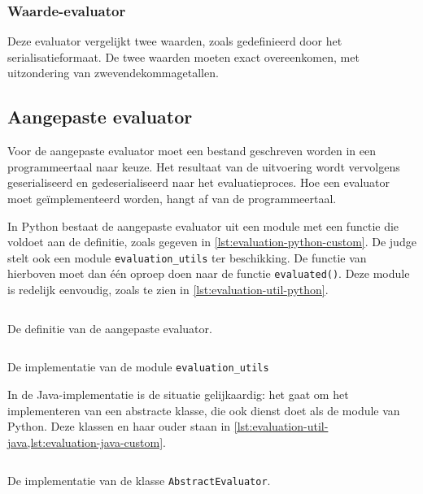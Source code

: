 \subsubsection{Waarde-evaluator}

Deze evaluator vergelijkt twee waarden, zoals gedefinieerd door het serialisatieformaat.
De twee waarden moeten exact overeenkomen, met uitzondering van zwevendekommagetallen.


\subsection{Aangepaste evaluator}\label{subsec:aangepaste-evaluator}

Voor de aangepaste evaluator moet een bestand geschreven worden in een programmeertaal naar keuze.
Het resultaat van de uitvoering wordt vervolgens geserialiseerd en gedeserialiseerd naar het evaluatieproces.
Hoe een evaluator moet geïmplementeerd worden, hangt af van de programmeertaal.

In Python bestaat de aangepaste evaluator uit een module met een functie die voldoet aan de definitie, zoals gegeven in \cref{lst:evaluation-python-custom}.
De judge stelt ook een module \texttt{evaluation\_utils} ter beschikking.
De functie van hierboven moet dan één oproep doen naar de functie \texttt{evaluated()}.
Deze module is redelijk eenvoudig, zoals te zien in \cref{lst:evaluation-util-python}.

\begin{listing}
    \inputminted{python}{code/custom_signature.py}
    \caption{De definitie van de aangepaste evaluator.}
    \label{lst:evaluation-python-custom}
\end{listing}

\begin{listing}
    \inputminted{python}{../../judge/runners/templates/python/evaluation_utils.py}
    \caption{De implementatie van de module \texttt{evaluation\_utils}}
    \label{lst:evaluation-util-python}
\end{listing}

In de Java-implementatie is de situatie gelijkaardig: het gaat om het implementeren van een abstracte klasse, die ook dienst doet als de module van Python.
Deze klassen en haar ouder staan in \cref{lst:evaluation-util-java,lst:evaluation-java-custom}.

\begin{listing}
    \inputminted{java}{../../judge/runners/templates/java/AbstractEvaluator.java}
    \caption{De implementatie van de klasse \texttt{AbstractEvaluator}.}
    \label{lst:evaluation-util-java}
\end{listing}

